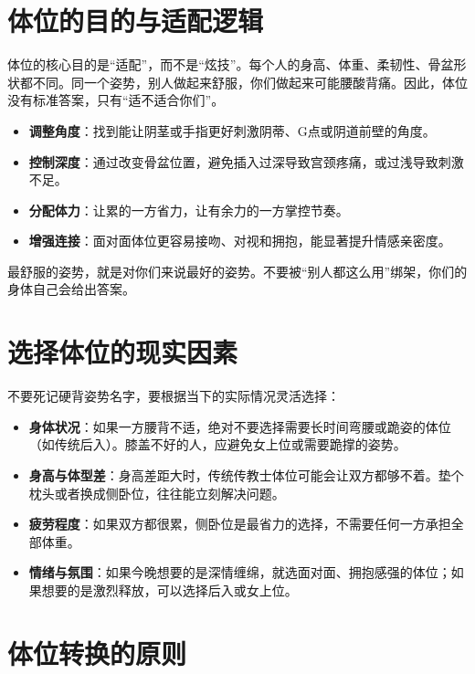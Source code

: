 \documentclass[12pt,UTF8]{ctexbook}
\begin{document}
\section{体位的目的与适配逻辑}

体位的核心目的是“适配”，而不是“炫技”。每个人的身高、体重、柔韧性、骨盆形状都不同。同一个姿势，别人做起来舒服，你们做起来可能腰酸背痛。因此，体位没有标准答案，只有“适不适合你们”。

\begin{itemize}
\item \textbf{调整角度}：找到能让阴茎或手指更好刺激阴蒂、G点或阴道前壁的角度。
\item \textbf{控制深度}：通过改变骨盆位置，避免插入过深导致宫颈疼痛，或过浅导致刺激不足。
\item \textbf{分配体力}：让累的一方省力，让有余力的一方掌控节奏。
\item \textbf{增强连接}：面对面体位更容易接吻、对视和拥抱，能显著提升情感亲密度。
\end{itemize}

\begin{tcolorbox}[colback=pink!5!white,colframe=red!50!black,title=贴心小叮咛]
	最舒服的姿势，就是对你们来说最好的姿势。不要被“别人都这么用”绑架，你们的身体自己会给出答案。
\end{tcolorbox}

\section{选择体位的现实因素}

不要死记硬背姿势名字，要根据当下的实际情况灵活选择：
\begin{itemize}
\item \textbf{身体状况}：如果一方腰背不适，绝对不要选择需要长时间弯腰或跪姿的体位（如传统后入）。膝盖不好的人，应避免女上位或需要跪撑的姿势。
\item \textbf{身高与体型差}：身高差距大时，传统传教士体位可能会让双方都够不着。垫个枕头或者换成侧卧位，往往能立刻解决问题。
\item \textbf{疲劳程度}：如果双方都很累，侧卧位是最省力的选择，不需要任何一方承担全部体重。
\item \textbf{情绪与氛围}：如果今晚想要的是深情缠绵，就选面对面、拥抱感强的体位；如果想要的是激烈释放，可以选择后入或女上位。
\end{itemize}

\section{体位转换的原则}
\end{document}

